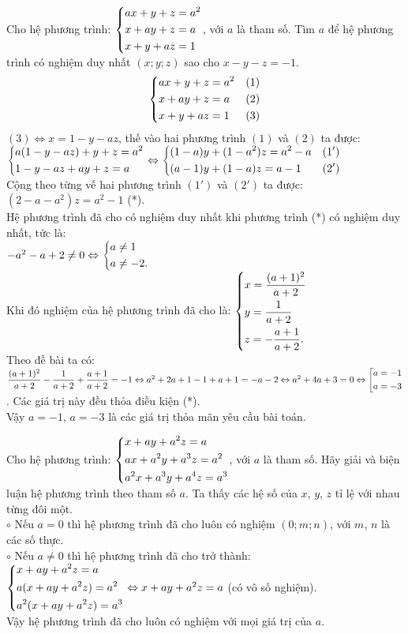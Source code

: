 \begin{ex}%
 Cho hệ phương trình: $\left\{\begin{aligned}& ax+y+z=a^2 \\& x+ay+z=a \\& x+y+az=1\end{aligned}\right.$, với $a$ là tham số. Tìm $a$ để hệ phương trình có nghiệm duy nhất $(x;y;z)$ sao cho $x-y-z=-1$.
 \loigiai
  {
  $$\left\{\begin{aligned}& ax+y+z=a^2 & (1) \\& x+ay+z=a & (2) \\& x+y+az=1 & (3)\end{aligned}\right.$$
  $(3) \Leftrightarrow x = 1-y-az$, thế vào hai phương trình $(1)$ và $(2)$ ta được:\\
  $\left\{\begin{aligned}& a(1-y-az) + y + z = a^2 \\& 1-y-az + ay + z = a\end{aligned}\right. \Leftrightarrow \left\{\begin{aligned}& (1-a)y + (1-a^2)z = a^2-a & (1') \\& (a-1)y + (1-a)z = a-1 & (2')\end{aligned}\right.$\\
  Cộng theo từng vế hai phương trình $(1')$ và $(2')$ ta được: $(2-a-a^2)z=a^2-1$ (*).\\
  Hệ phương trình đã cho có nghiệm duy nhất khi phương trình (*) có nghiệm duy nhất, tức là:\\
  $-a^2-a+2 \neq 0 \Leftrightarrow \left\{\begin{aligned}& a \neq 1 \\& a \neq -2.\end{aligned}\right.$\\
  Khi đó nghiệm của hệ phương trình đã cho là: $\left\{\begin{aligned}& x = \dfrac{(a+1)^2}{a+2} \\& y = \dfrac{1}{a+2} \\& z = -\dfrac{a+1}{a+2}.\end{aligned}\right.$\\
  Theo đề bài ta có:\\
  $\dfrac{(a+1)^2}{a+2} - \dfrac{1}{a+2} + \dfrac{a+1}{a+2} = -1 \Leftrightarrow a^2 + 2a + 1 - 1 + a + 1 = -a -2 \Leftrightarrow a^2 + 4a + 3 = 0 \Leftrightarrow \left[\begin{aligned}& a = -1 \\& a = -3\end{aligned}\right.$. Các giá trị này đều thỏa điều kiện (*).\\
  Vậy $a = -1$, $a = -3$ là các giá trị thỏa mãn yêu cầu bài toán.
  }
\end{ex}


\begin{ex}%
 Cho hệ phương trình: $\left\{\begin{aligned}& x+ay+a^2z=a \\& ax+a^2y+a^3z=a^2 \\& a^2x+a^3y+a^4z=a^3\end{aligned}\right.$, với $a$ là tham số. Hãy giải và biện luận hệ phương trình theo tham số $a$.
 \loigiai
  {
  Ta thấy các hệ số của $x$, $y$, $z$ tỉ lệ với nhau từng đôi một.\\
  $\circ$ Nếu $a = 0$ thì hệ phương trình đã cho luôn có nghiệm $(0;m;n)$, với $m$, $n$ là các số thực.\\
  $\circ$ Nếu $a \neq 0$ thì hệ phương trình đã cho trở thành:\\
  $\left\{\begin{aligned}& x+ay+a^2z=a \\& a(x+ay+a^2z)=a^2 \\& a^2(x+ay+a^2z)=a^3\end{aligned}\right. \Leftrightarrow x + ay +a^2z = a$ (có vô số nghiệm).\\
  Vậy hệ phương trình đã cho luôn có nghiệm với mọi giá trị của $a$.
  }
\end{ex}


